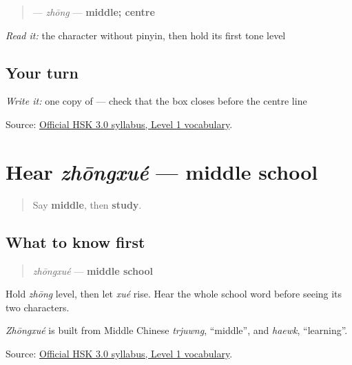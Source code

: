 \begin{cousinweb}
\begin{quote}
\textbf{} — \emph{zhōng} — \textbf{middle; centre}
\end{quote}

\emph{Read it:} the character without pinyin, then hold its first tone level
\end{cousinweb}

\subsection*{Your turn}
\emph{Write it:} one copy of \textbf{} — check that the box closes before the centre line

\begin{tcolorbox}[breakable,colback=teal!4,colframe=teal!35!black,title={Before you move on}]
Source: \href{https://hsk.cn-bj.ufileos.com/3.0/\%E6\%96\%B0\%E7\%89\%88HSK\%E8\%80\%83\%E8\%AF\%95\%E5\%A4\%A7\%E7\%BA\%B21219.pdf}{Official HSK 3.0 syllabus, Level 1 vocabulary}.
\end{tcolorbox}
\section[zhōngxué]{Hear \emph{zhōngxué} — middle school}

\label{lesson:ZH-C15-hear-zhongxue}



\begin{quote}
Say \textbf{middle}, then \textbf{study}.
\end{quote}

\subsection*{What to know first}
\begin{quote}
\emph{zhōngxué} — \textbf{middle school}
\end{quote}

Hold \emph{zhōng} level, then let \emph{xué} rise. Hear the whole school word before seeing its two characters.

\emph{Zhōngxué} is built from Middle Chinese \emph{trjuwng}, \textquotedblleft{}middle\textquotedblright{}, and \emph{haewk}, \textquotedblleft{}learning\textquotedblright{}.

\begin{tcolorbox}[breakable,colback=teal!4,colframe=teal!35!black,title={Before you move on}]
Source: \href{https://hsk.cn-bj.ufileos.com/3.0/\%E6\%96\%B0\%E7\%89\%88HSK\%E8\%80\%83\%E8\%AF\%95\%E5\%A4\%A7\%E7\%BA\%B21219.pdf}{Official HSK 3.0 syllabus, Level 1 vocabulary}.
\end{tcolorbox}
